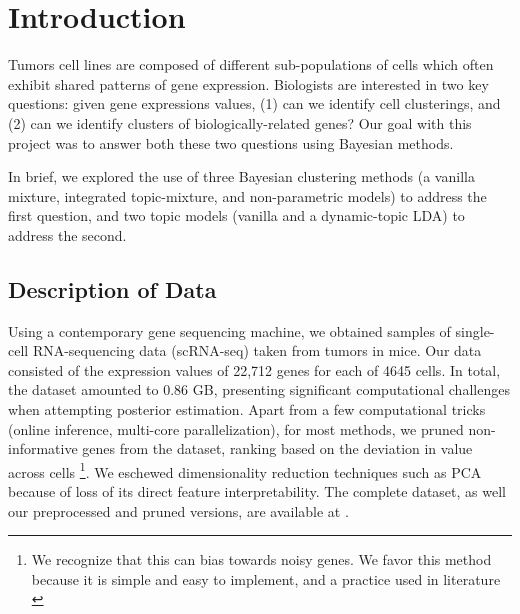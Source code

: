 \documentclass{article}
\begin{document}
 


\section{Introduction}
\label{intro}
Tumors cell lines are composed of different sub-populations of cells which often exhibit shared patterns of gene expression. Biologists are interested in two key questions: given gene expressions values, (1) can we identify cell clusterings, and (2) can we identify clusters of biologically-related genes? Our goal with this project was to answer both these two questions using Bayesian methods.

In brief, we explored the use of three Bayesian clustering methods (a vanilla mixture, integrated topic-mixture, and non-parametric models) to address the first question, and two topic models (vanilla and a dynamic-topic LDA) to address the second. 

\subsection{Description of Data}
Using a contemporary gene sequencing machine, we obtained samples of single-cell RNA-sequencing data (scRNA-seq) taken from tumors in mice. Our data consisted of the expression values of 22,712 genes for each of 4645 cells. In total, the dataset amounted to 0.86 GB, presenting significant computational challenges when attempting posterior estimation. Apart from a few computational tricks (online inference, multi-core parallelization), for most methods, we pruned non-informative genes from the dataset, ranking based on the deviation in value across cells \footnote{We recognize that this can bias towards noisy genes. We favor this method because it is simple and easy to implement, and a practice used in literature \cite{pruning}}. We eschewed dimensionality reduction techniques such as PCA because of loss of its direct feature interpretability. The complete dataset, as well our preprocessed and pruned versions, are available at \cite{dataset}.
\end{document}
